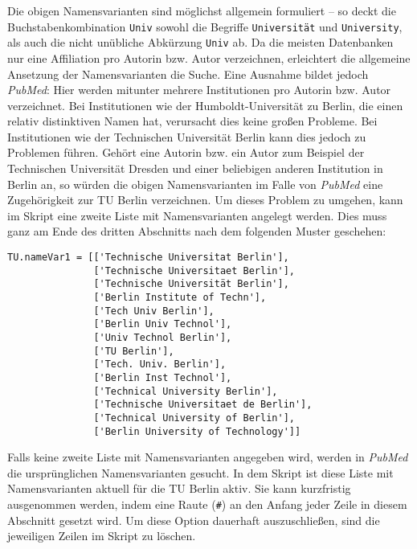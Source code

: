 Die obigen Namensvarianten sind möglichst allgemein formuliert -- so deckt die Buchstabenkombination \texttt{Univ} sowohl die Begriffe \texttt{Universität} und \texttt{University}, als auch die nicht unübliche Abkürzung \texttt{Univ} ab. Da die meisten Datenbanken nur eine Affiliation pro Autorin bzw. Autor verzeichnen, erleichtert die allgemeine Ansetzung der Namensvarianten die Suche. Eine Ausnahme bildet jedoch \textit{PubMed}: Hier werden mitunter mehrere Institutionen pro Autorin bzw. Autor verzeichnet. Bei Institutionen wie der Humboldt-Universität zu Berlin, die einen relativ distinktiven Namen hat, verursacht dies keine großen Probleme. Bei Institutionen wie der Technischen Universität Berlin kann dies jedoch zu Problemen führen. Gehört eine Autorin bzw. ein Autor zum Beispiel der Technischen Universität Dresden und einer beliebigen anderen Institution in Berlin an, so würden die obigen Namensvarianten im Falle von \textit{PubMed} eine Zugehörigkeit zur TU Berlin verzeichnen. Um dieses Problem zu umgehen, kann im Skript eine zweite Liste mit Namensvarianten angelegt werden. Dies muss ganz am Ende des dritten Abschnitts nach dem folgenden Muster geschehen:
\begin{verbatim}
TU.nameVar1 = [['Technische Universitat Berlin'],
               ['Technische Universitaet Berlin'],
               ['Technische Universität Berlin'],
               ['Berlin Institute of Techn'],
               ['Tech Univ Berlin'],
               ['Berlin Univ Technol'],
               ['Univ Technol Berlin'],
               ['TU Berlin'],
               ['Tech. Univ. Berlin'],
               ['Berlin Inst Technol'],
               ['Technical University Berlin'],
               ['Technische Universitaet de Berlin'],
               ['Technical University of Berlin'],
               ['Berlin University of Technology']]
\end{verbatim}

Falls keine zweite Liste mit Namensvarianten angegeben wird, werden in \textit{PubMed} die ursprünglichen Namensvarianten gesucht. In dem Skript ist diese Liste mit Namensvarianten aktuell für die TU Berlin aktiv. Sie kann kurzfristig ausgenommen werden, indem eine Raute (\texttt{\#}) an den Anfang jeder Zeile in diesem Abschnitt gesetzt wird. Um diese Option dauerhaft auszuschließen, sind die jeweiligen Zeilen im Skript zu löschen.

